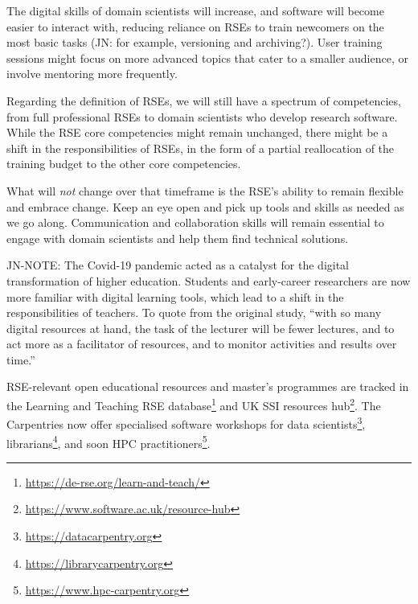 \documentclass{eceasst}
\begin{document}
The digital skills of domain scientists will increase,
and software will become easier to interact with,
reducing reliance on RSEs to train newcomers on the most basic tasks
(JN: for example, versioning and archiving?).
User training sessions might focus on more advanced topics
that cater to a smaller audience, or involve mentoring more frequently.

Regarding the definition of RSEs, we will still have a spectrum of competencies,
from full professional RSEs to domain scientists who develop research software.
While the RSE core competencies\cite{Goth2024} might remain unchanged,
there might be a shift in the responsibilities of RSEs,
in the form of a partial reallocation of the training budget
to the other core competencies.

What will \emph{not} change over that timeframe is the RSE's ability to remain
flexible and embrace change. Keep an eye open and pick up tools and skills
as needed as we go along.
Communication and collaboration skills will remain essential to engage
with domain scientists and help them find technical solutions.

\begin{FramedParagraphWithFootnotes}
JN-NOTE:
The Covid-19 pandemic acted as a catalyst for the digital transformation
of higher education\cite{Bygstad2022}. Students and early-career researchers
are now more familiar with digital learning tools, which lead to a shift
in the responsibilities of teachers. To quote from the original study,
``with so many digital resources at hand,
the task of the lecturer will be fewer lectures,
and to act more as a facilitator of resources,
and to monitor activities and results over time.''\cite{Bygstad2022}

RSE-relevant open educational resources and master's programmes are tracked
in the Learning and Teaching RSE database\footnote{\url{https://de-rse.org/learn-and-teach/}}
and UK SSI resources hub\footnote{\url{https://www.software.ac.uk/resource-hub}}.
The Carpentries now offer specialised software workshops
for data scientists\footnote{\url{https://datacarpentry.org}},
librarians\footnote{\url{https://librarycarpentry.org}},
and soon HPC practitioners\footnote{\url{https://www.hpc-carpentry.org}}.
\end{FramedParagraphWithFootnotes}
\end{document}
